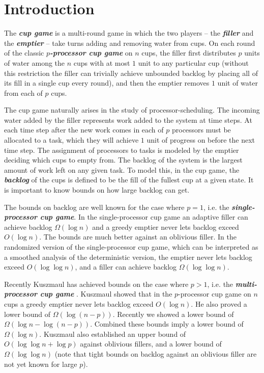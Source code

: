 \documentclass[twocolumn]{article}[10pt]
\newcommand{\defn}[1]{{\textit{\textbf{\boldmath #1}}}\xspace}
\renewcommand{\paragraph}[1]{\vspace{0.09in}\noindent{\bf \boldmath #1.}}
\begin{document}
\section{Introduction}
\paragraph{Definition and Motivation}
The \defn{cup game} is a multi-round game in which the two players -- the
\defn{filler} and the \defn{emptier} -- take turns adding and removing water
from cups. On each round of the classic \defn{$p$-processor cup game} on $n$
cups, the filler first distributes $p$ units of water among
the $n$ cups with at most $1$ unit to any particular cup (without this
restriction the filler can trivially achieve unbounded backlog by placing all
of its fill in a single cup every round), and then the emptier 
removes $1$ unit of water from each of $p$ cups.

The cup game naturally arises in the study of processor-scheduling.
The incoming water added by the filler represents work added to the system at
time steps. At each time step after the new work comes in each of $p$
processors must be allocated to a task, which they will achieve $1$ unit of
progress on before the next time step. The assignment of processors to tasks is
modeled by the emptier deciding which cups to empty from. The backlog of
the system is the largest amount of work left on any given task. To model this,
in the cup game, the \defn{backlog} of the cups is defined to be the fill of
the fullest cup at a given state. 
It is important to know bounds on how large backlog can get.

\paragraph{Previous Work}
The bounds on backlog are well known for the case where $p=1$, i.e. the
\defn{single-processor cup game}.
In the single-processor cup game an adaptive filler can achieve backlog
$\Omega(\log n)$ and a greedy emptier never lets backlog exceed $O(\log n)$.
The bounds are much better against an oblivious filler.
In the randomized version of the single-processor cup game, which can be
interpreted as a smoothed analysis of the deterministic version, the emptier
never lets backlog exceed $O(\log \log n)$, and a filler can achieve backlog
$\Omega(\log\log n)$.

Recently Kuszmaul has achieved bounds on the case where $p>1$, i.e. the
\defn{multi-processor cup game} \cite{wku20}. Kuszmaul showed that in the 
$p$-processor cup game on $n$ cups a greedy emptier never lets backlog exceed
$O(\log n)$. He also proved a lower bound of $\Omega(\log (n-p))$. Recently we
showed a lower bound of $\Omega(\log n - \log (n-p))$. Combined these bounds
imply a lower bound of $\Omega(\log n)$.
Kuszmaul also established an upper bound of $O(\log\log n + \log p)$ against
oblivious fillers, and a lower bound of $\Omega(\log\log n)$ (note that tight
bounds on backlog against an oblivious filler are not yet known for large $p$).
\end{document}
